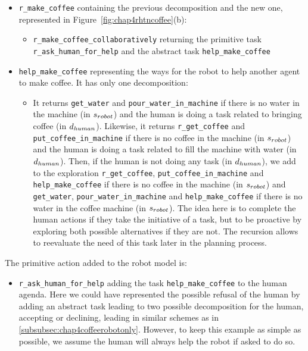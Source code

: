 \documentclass[a4paper,11pt,twoside]{StyleThese}
\begin{document}
\begin{itemize}
\item \verb'r_make_coffee' containing the previous decomposition and the new one, represented in Figure~\ref{fig:chap4rhtncoffee}(b):
	\begin{itemize}
	\item \verb'r_make_coffee_collaboratively' returning the primitive task \verb'r_ask_human_for_help' and the abstract task \verb'help_make_coffee'
	\end{itemize}
\item \verb'help_make_coffee' representing the ways for the robot to help another agent to make coffee. It has only one decomposition:
	\begin{itemize}
	\item It returns \verb'get_water' and \verb'pour_water_in_machine' if there is no water in the machine (in $s_{robot}$) and the human is doing a task related to bringing coffee (in $d_{human}$). Likewise, it returns \verb'r_get_coffee' and \verb'put_coffee_in_machine' if there is no coffee in the machine (in $s_{robot}$) and the human is doing a task related to fill the machine with water (in $d_{human}$). Then, if the human is not doing any task (in $d_{human}$), we add to the exploration \verb'r_get_coffee', \verb'put_coffee_in_machine' and \verb'help_make_coffee' if there is no coffee in the machine (in $s_{robot}$) and \verb'get_water', \verb'pour_water_in_machine' and \verb'help_make_coffee' if there is no water in the coffee machine (in $s_{robot}$). The idea here is to complete the human actions if they take the initiative of a task, but to be proactive by exploring both possible alternatives if they are not. The recursion allows to reevaluate the need of this task later in the planning process.
	\end{itemize}
\end{itemize}

The primitive action added to the robot model is:
\begin{itemize}
\item \verb'r_ask_human_for_help' adding the task \verb'help_make_coffee' to the human agenda. Here we could have represented the possible refusal of the human by adding an abstract task leading to two possible decomposition for the human, accepting or declining, leading in similar schemes as in \ref{subsubsec:chap4coffeerobotonly}. However, to keep this example as simple as possible, we assume the human will always help the robot if asked to do so.
\end{itemize}
\end{document}
